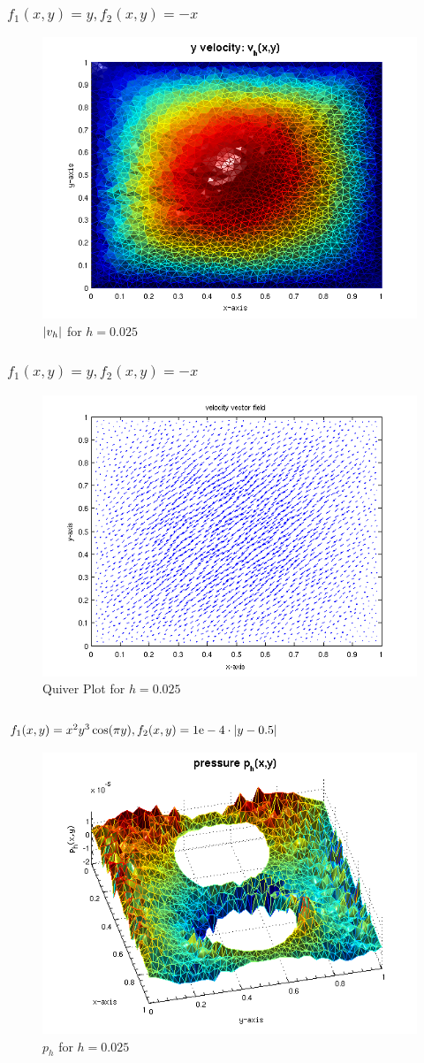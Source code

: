 \documentclass{beamer}
\begin{document}
\begin{frame}
    \frametitle{$f_1(x,y) = y, f_2(x,y) = -x$}
\begin{figure}
\includegraphics[width=0.5\linewidth]{./magv_2.png}
\caption{$\left|v_h\right|$ for $h=0.025$}
\end{figure}
\end{frame}

\begin{frame}
    \frametitle{$f_1(x,y) = y, f_2(x,y) = -x$}
\begin{figure}
\includegraphics[width=0.5\linewidth]{./q2.png}
\caption{Quiver Plot for $h=0.025$}
\end{figure}
\end{frame}


\begin{frame}
    \frametitle{$f_1(x,y) = x^2 y^3 \cos(\pi y), f_2(x,y) = 1\text{e}-4 \cdot
    \left|y - 0.5\right|$}
\begin{figure}
\includegraphics[width=0.5\linewidth]{./p3.png}
\caption{$p_h$ for $h=0.025$}
\end{figure}
\end{frame}
\end{document}
